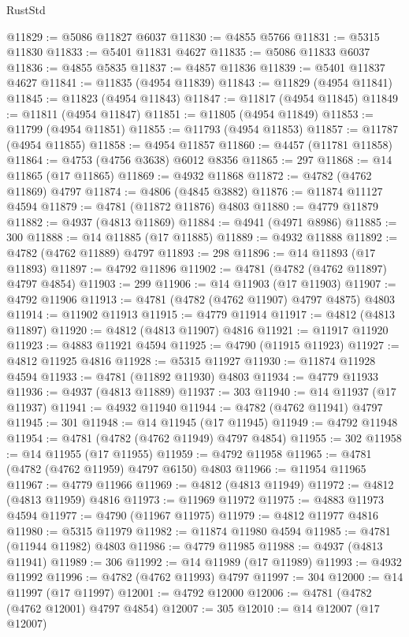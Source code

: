 \begin{lexlean}{RustStd}
\begin{coremodule}
@11829 := @5086 @11827 @6037
@11830 := @4855 @5766
@11831 := @5315 @11830
@11833 := @5401 @11831 @4627
@11835 := @5086 @11833 @6037
@11836 := @4855 @5835
@11837 := @4857 @11836
@11839 := @5401 @11837 @4627
@11841 := @11835 (@4954 @11839)
@11843 := @11829 (@4954 @11841)
@11845 := @11823 (@4954 @11843)
@11847 := @11817 (@4954 @11845)
@11849 := @11811 (@4954 @11847)
@11851 := @11805 (@4954 @11849)
@11853 := @11799 (@4954 @11851)
@11855 := @11793 (@4954 @11853)
@11857 := @11787 (@4954 @11855)
@11858 := @4954 @11857
@11860 := @4457 (@11781 @11858)
@11864 := @4753 (@4756 @3638) @6012 @8356
@11865 := 297
@11868 := @14 @11865 (@17 @11865)
@11869 := @4932 @11868
@11872 := @4782 (@4762 @11869) @4797
@11874 := @4806 (@4845 @3882)
@11876 := @11874 @11127 @4594
@11879 := @4781 (@11872 @11876) @4803
@11880 := @4779 @11879
@11882 := @4937 (@4813 @11869)
@11884 := @4941 (@4971 @8986)
@11885 := 300
@11888 := @14 @11885 (@17 @11885)
@11889 := @4932 @11888
@11892 := @4782 (@4762 @11889) @4797
@11893 := 298
@11896 := @14 @11893 (@17 @11893)
@11897 := @4792 @11896
@11902 := @4781 (@4782 (@4762 @11897) @4797 @4854)
@11903 := 299
@11906 := @14 @11903 (@17 @11903)
@11907 := @4792 @11906
@11913 := @4781 (@4782 (@4762 @11907) @4797 @4875) @4803
@11914 := @11902 @11913
@11915 := @4779 @11914
@11917 := @4812 (@4813 @11897)
@11920 := @4812 (@4813 @11907) @4816
@11921 := @11917 @11920
@11923 := @4883 @11921 @4594
@11925 := @4790 (@11915 @11923)
@11927 := @4812 @11925 @4816
@11928 := @5315 @11927
@11930 := @11874 @11928 @4594
@11933 := @4781 (@11892 @11930) @4803
@11934 := @4779 @11933
@11936 := @4937 (@4813 @11889)
@11937 := 303
@11940 := @14 @11937 (@17 @11937)
@11941 := @4932 @11940
@11944 := @4782 (@4762 @11941) @4797
@11945 := 301
@11948 := @14 @11945 (@17 @11945)
@11949 := @4792 @11948
@11954 := @4781 (@4782 (@4762 @11949) @4797 @4854)
@11955 := 302
@11958 := @14 @11955 (@17 @11955)
@11959 := @4792 @11958
@11965 := @4781 (@4782 (@4762 @11959) @4797 @6150) @4803
@11966 := @11954 @11965
@11967 := @4779 @11966
@11969 := @4812 (@4813 @11949)
@11972 := @4812 (@4813 @11959) @4816
@11973 := @11969 @11972
@11975 := @4883 @11973 @4594
@11977 := @4790 (@11967 @11975)
@11979 := @4812 @11977 @4816
@11980 := @5315 @11979
@11982 := @11874 @11980 @4594
@11985 := @4781 (@11944 @11982) @4803
@11986 := @4779 @11985
@11988 := @4937 (@4813 @11941)
@11989 := 306
@11992 := @14 @11989 (@17 @11989)
@11993 := @4932 @11992
@11996 := @4782 (@4762 @11993) @4797
@11997 := 304
@12000 := @14 @11997 (@17 @11997)
@12001 := @4792 @12000
@12006 := @4781 (@4782 (@4762 @12001) @4797 @4854)
@12007 := 305
@12010 := @14 @12007 (@17 @12007)

\end{coremodule}
\end{lexlean}
